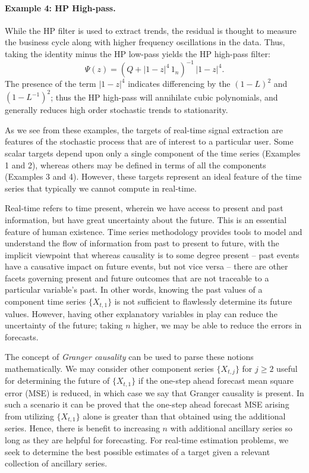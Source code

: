 \documentclass[a4paper]{book}
\begin{document}
\paragraph{Example 4: HP High-pass.}  While the HP filter is used to extract
 trends, the residual is thought to measure the business cycle along with
 higher frequency oscillations in the data.  Thus, taking the identity minus the
 HP low-pass yields the HP high-pass filter:
\[
  \Psi (z) =   { \left( Q + {| 1 - z|}^4 \, 1_n \right) }^{-1} \, {|1 - z|}^4.
\]
  The presence of the term ${|1 - z|}^4$ indicates differencing by the ${(1-L)}^2$
 and ${(1 - L^{-1})}^2$; thus the HP high-pass will annihilate cubic polynomials,
 and generally reduces high order stochastic trends to stationarity.  

\vspace{.5cm}

As we see from these examples, the targets of real-time signal 
 extraction  are features of the stochastic process that are of interest to 
 a particular user.  Some scalar targets depend upon only  a single component 
 of the time series (Examples 1 and 2), whereas others may be defined in
 terms of all the components (Examples 3 and 4).  However, these targets
 represent an ideal feature of the time series that typically we cannot compute
 in real-time.

 Real-time refers to time present, wherein we have access to present and past 
 information, but have great uncertainty about the future.  This is an 
 essential feature of human existence.  Time series methodology provides tools
 to model and understand the flow of information from past to present to future,
 with the implicit viewpoint that whereas causality is to some degree present --
 past events have  a causative impact on future events, but not vice versa --
 there are other facets governing present and future outcomes that are not 
 traceable to a particular variable's past.  In other words, knowing the past
 values of a component time series $\{ X_{t,1} \}$ is not sufficient to flawlessly
 determine its future values.  However, having other explanatory variables in play
 can reduce the uncertainty of the future; taking $n$ higher, we may be able
 to reduce the errors in forecasts.  

 The concept of {\em Granger causality} can be used to parse these notions mathematically.
 We may consider other component series $\{ X_{t,j} \}$ for $j \geq 2$ useful
 for determining the future of $\{ X_{t,1} \}$ if the one-step ahead forecast
 mean square error (MSE) is reduced, in which case we say that Granger causality
 is present.  In such a scenario it can be proved that the one-step ahead forecast
 MSE arising from utilizing $\{ X_{t,1} \}$ alone is greater than that obtained
 using the additional series.  Hence, there is benefit to increasing $n$ with 
 additional ancillary series so long as they are helpful for forecasting.  For real-time
 estimation problems, we seek to determine the best possible estimates of a
 target given a relevant collection of ancillary series.
\end{document}
